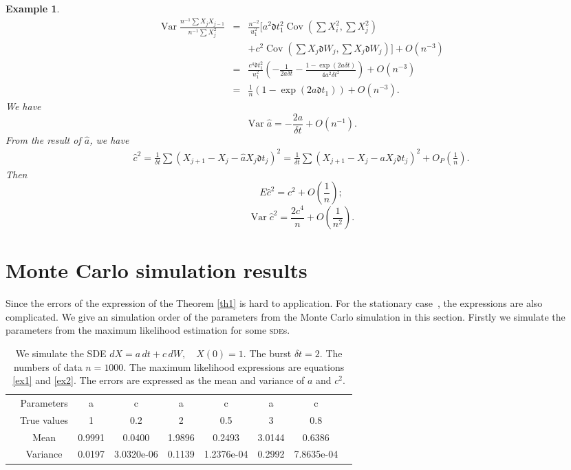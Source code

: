 \documentclass[12pt,reqno, a4paper]{article}
\newtheorem{example}[theorem]{Example}
\numberwithin{equation}{section}
\begin{document}
\begin{example}
\begin{eqnarray*}
\operatorname{Var}\frac {n^{-1} {\sum X_jX_{j-1}}}{n^{-1} \sum X_j^2}&=&\frac {n^{-2}} {u_1^2} \bigg [ a^2\mathfrak{d} t_1^2\operatorname{Cov}(\sum X_i^2,\sum X_j^2)\\&&+c^2\operatorname{Cov}(\sum X_{j}\mathfrak{d} W_j, \sum X_j\mathfrak{d} W_j)\bigg ]+O(n^{-3})\\&=&\frac {c^4\mathfrak{d} t_1^2}{u_1^2}(-\frac 1{2a\delta t}-\frac {1-\exp(2a\delta t)}{4a^2\delta t^2})+O(n^{-3})\\&=&\frac 1 n (1-\exp(2a\mathfrak{d}t_1 ))+O(n^{-3}).\end{eqnarray*}
We have
 $$\operatorname{Var}\hat{a}=-\frac {2a}{\delta t}+O(n^{-1}).$$
 From the result of $\hat{a}$, we have
 \begin{eqnarray*}
  \hat{c}^2=\frac 1 {\delta t}\sum  (X_{j+1}-X_{j}-\hat{a}X_j\mathfrak{d}t_j)^2=\frac 1 {\delta t}\sum  (X_{j+1}-X_{j}-{a}X_j\mathfrak{d}t_j)^2+O_P(\frac 1 n).
 \end{eqnarray*}
 Then
 $$E\hat{c}^2=c^2+O(\frac 1 n);$$
$$\operatorname{Var} \hat{c}^2=\frac {2c^4}{ n}+O(\frac 1 {n^2}).$$

\end{example}
\section{Monte Carlo simulation results}
Since the errors of the expression of the Theorem \ref{th1} is hard to application. For the stationary case~\cite{Tang}, the expressions are also complicated.  We give an simulation order of the parameters  from the Monte Carlo  simulation in this section.  Firstly we simulate the parameters from the maximum likelihood  estimation  for some \textsc{sde}s.

\begin{table}[htbp]
  \caption{\label{tab1} We simulate the \textsc{SDE}
$
dX=a\, dt+c\, dW,   \quad  X(0)=1.
$  The burst  $\delta t=2$. The numbers of data $n=1000$. The maximum likelihood expressions are equations \eqref{ex1} and \eqref{ex2}. The errors are expressed as the mean  and variance of  $a$ and $c^2$. }
 \begin{tabular}{ccccccccc}
  \toprule
  &Parameters & a & c &  a & c& a & c\\
  &  True values  &1 & 0.2 & 2 & 0.5&3 &0.8 \\
  \midrule
&Mean&  0.9991 & 0.0400&  1.9896&0.2493& 3.0144& 0.6386 \\
& Variance &0.0197&3.0320e-06 &  0.1139 &  1.2376e-04 & 0.2992&7.8635e-04 \\
  \bottomrule
 \end{tabular}

\end{table}
\end{document}
